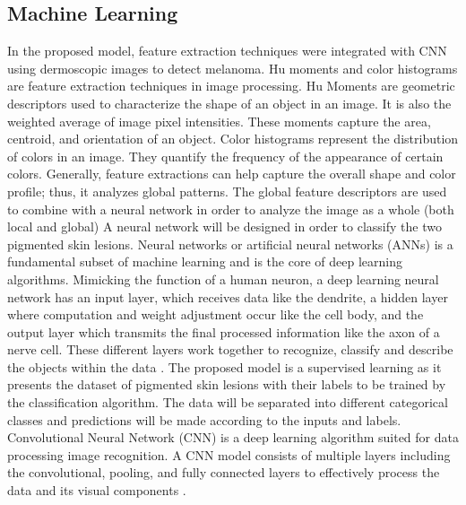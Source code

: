 \documentclass[10pt,twocolumn]{article}
\begin{document}
\subsection{Machine Learning}
In the proposed model, feature extraction techniques were integrated with CNN using dermoscopic images to detect melanoma. Hu moments and color histograms are feature extraction techniques in image processing. Hu Moments are geometric descriptors used to characterize the shape of an object in an image. It is also the weighted average of image pixel intensities. These moments capture the area, centroid, and orientation of an object. Color histograms represent the distribution of colors in an image. They quantify the frequency of the appearance of certain colors. Generally, feature extractions can help capture the overall shape and color profile; thus, it analyzes global patterns. The global feature descriptors are used to combine with a neural network in order to analyze the image as a whole (both local and global) \cite{pham2021ai}
\newline
\newline
A neural network will be designed in order to classify the two pigmented skin lesions. Neural networks or artificial neural networks (ANNs) is a fundamental subset of machine learning and is the core of deep learning algorithms. Mimicking the function of a human neuron, a deep learning neural network has an input layer, which receives data like the dendrite, a hidden layer where computation and weight adjustment occur like the cell body, and the output layer which transmits the final processed information like the axon of a nerve cell. These different layers work together to recognize, classify and describe the objects within the data \cite{IBM}.
\newline
\newline
The proposed model is a supervised learning as it presents the dataset of pigmented skin lesions with their labels to be trained by the classification algorithm. The data will be separated into different categorical classes and predictions will be made according to the inputs and labels.
\newline
\newline
Convolutional Neural Network (CNN) is a deep learning algorithm suited for data processing image recognition. A CNN model consists of multiple layers including the convolutional, pooling, and fully connected layers to effectively process the data and its visual components \cite{Mishra_2020}. 
\newline
\end{document}
